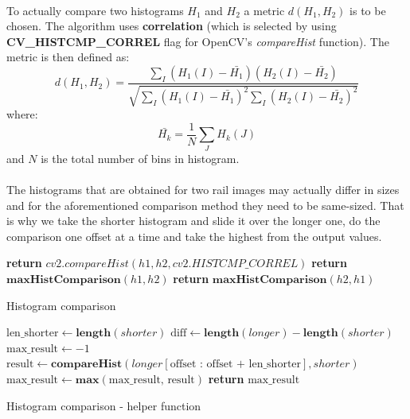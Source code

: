 \paragraph{}
To actually compare two histograms $H_1$ and $H_2$ a metric $d(H_1, H_2)$ is to be chosen. The algorithm uses \textbf{correlation} (which is selected by using \textbf{CV\_HISTCMP\_CORREL} flag for OpenCV's \textit{compareHist} function). The metric is then defined as:
\begin{equation}
	d(H_1, H_2) = \frac{\sum_I(H_1(I) - \bar{H_1})(H_2(I) - \bar{H_2})}{\sqrt{\sum_I(H_1(I) - \bar{H_1})^2 \sum_I(H_2(I) - \bar{H_2})^2}}
\end{equation}
where:
\begin{equation}
	\bar{H_k} = \frac{1}{N} \sum_J H_k(J)
\end{equation}
and $N$ is the total number of bins in histogram.

\paragraph{}
The histograms that are obtained for two rail images may actually differ in sizes and for the aforementioned comparison method they need to be same-sized. That is why we take the shorter histogram and slide it over the longer one, do the comparison one offset at a time and take the highest from the output values.

\begin{algorithm}
	\begin{spacing}{1.5}
	\begin{algorithmic}[1]
				\State \textbf{return} $cv2.compareHist(h1, h2, cv2.HISTCMP\_CORREL)$
				\State \textbf{return} $\textbf{maxHistComparison}(h1, h2)$
			\Else
				\State \textbf{return} $\textbf{maxHistComparison}(h2, h1)$
			\EndIf
		\EndFunction
	\end{algorithmic}
	\end{spacing}
	\caption{Histogram comparison}
\end{algorithm}

\begin{algorithm}
	\begin{spacing}{1.5}
	\begin{algorithmic}[1]
			\State $\text{len\_shorter} \gets \textbf{length}(shorter)$
			\State $\text{diff} \gets \textbf{length}(longer) - \textbf{length}(shorter)$
			\State $\text{max\_result} \gets -1$
				\State $\text{result} \gets \textbf{compareHist}(longer[\text{offset : offset + len\_shorter}], shorter)$
				\State $\text{max\_result} \gets \textbf{max}(\text{max\_result, result})$
			\EndFor
			\State \textbf{return} $\text{max\_result}$
		\EndFunction
	\end{algorithmic}
	\end{spacing}
	\caption{Histogram comparison - helper function}
\end{algorithm}

